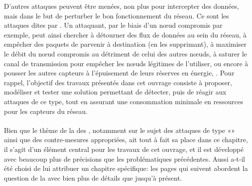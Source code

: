 D'autres attaques peuvent être menées, non plus pour intercepter des données, mais dans le but de perturber le bon fonctionnement du réseau.
Ce sont les attaques dites par \textit{\dds}.
Un attaquant, par le biais d'un nœud compromis par exemple, peut ainsi chercher à détourner des flux de données au sein du réseau, à empêcher des paquets de parvenir à destination (en les supprimant), à maximiser le débit du nœud compromis au détriment de celui des autres nœuds, à saturer le canal de transmission pour empêcher les nœuds légitimes de l'utiliser, ou encore à pousser les autres capteurs à l'épuisement de leurs réserves en énergie, \etc.
Pour rappel, l'objectif des travaux présentés dans cet ouvrage consiste à proposer, modéliser et tester une solution permettant de détecter, puis de réagir aux attaques de ce type, tout en assurant une consommation minimale en ressources pour les capteurs du réseau.

\paragraph{}
Bien que le thème de la \secu des \rcsfs, notamment sur le sujet des attaques de type «\dds» ainsi que des contre-mesures appropriées, ait tout à fait sa place dans ce chapitre, il s'agit d'un élément central pour les travaux de cet ouvrage, et il est développé avec beaucoup plus de précisions que les problématiques précédentes.
Aussi a-t-il été choisi de lui attribuer un chapitre spécifique: les pages qui suivent abordent la question de la \secu avec bien plus de détails que jusqu'à présent.
